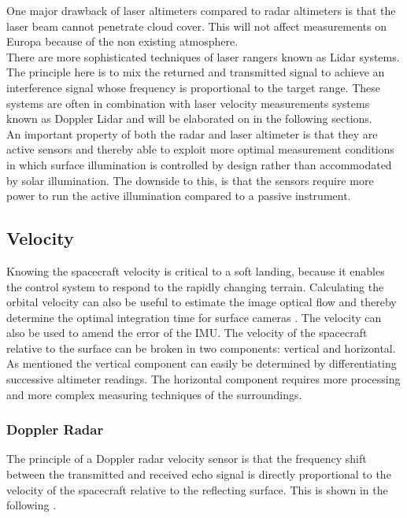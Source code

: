 One major drawback of laser altimeters compared to radar altimeters is that the laser beam cannot penetrate cloud cover. This will not affect measurements on Europa because of the non existing atmosphere.\\ 

There are more sophisticated techniques of laser rangers known as Lidar systems. The principle here is to mix the returned and transmitted signal to achieve an interference signal whose frequency is proportional to the target range. These systems are often in combination with laser velocity measurements systems known as Doppler Lidar and will be elaborated on in the following sections. \\

An important property of both the radar and laser altimeter is that they are active sensors and thereby able to exploit more optimal measurement conditions in which surface illumination is controlled by design rather than accommodated by  solar illumination. The downside to this, is that the sensors require more power to run the active illumination compared to a passive instrument. 

\subsection{Velocity}

Knowing the spacecraft velocity is critical to a soft landing, because it enables the control system to respond to the rapidly changing terrain. Calculating the orbital velocity can also be useful to estimate the image optical flow and thereby determine the optimal integration time for surface cameras \cite{alessandro}. The velocity can also be used to amend the error of the IMU. The velocity of the spacecraft relative to the surface can be broken in two components: vertical and horizontal. As mentioned the vertical component can easily be determined by differentiating successive altimeter readings. The horizontal component requires more processing and more complex measuring techniques of the surroundings. 

\subsubsection{Doppler Radar}
The principle of a Doppler radar velocity sensor is that the frequency shift between the transmitted and received echo signal is directly proportional to the velocity of the spacecraft relative to the reflecting surface. This is shown in the following \cite{henningdoppler}. \\

